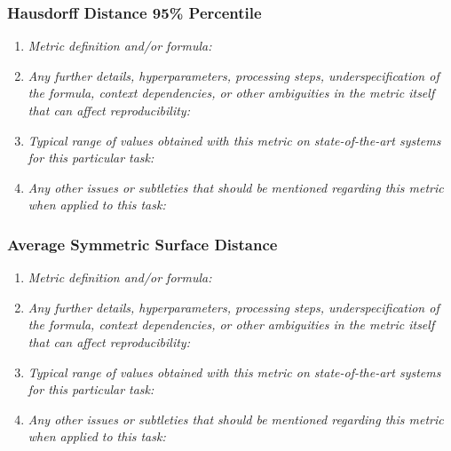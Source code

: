 \documentclass[a4paper,11pt]{article}
\begin{document}
        \subsubsection{Hausdorff Distance 95\% Percentile}
            \begin{enumerate}[label=\alph*.]
                \item \textit{Metric definition and/or formula:}
                \bigskip
                \item \textit{Any further details, hyperparameters, processing steps, underspecification of the formula, context dependencies, or other ambiguities in the metric itself that can affect reproducibility:}
                \bigskip
                \item \textit{Typical range of values obtained with this metric on state-of-the-art systems for this particular task:}
                \bigskip
                \item \textit{Any other issues or subtleties that should be mentioned regarding this metric when applied to this task:}
                \bigskip
            \end{enumerate}
        \subsubsection{Average Symmetric Surface Distance}
            \begin{enumerate}[label=\alph*.]
                \item \textit{Metric definition and/or formula:}
                \bigskip
                \item \textit{Any further details, hyperparameters, processing steps, underspecification of the formula, context dependencies, or other ambiguities in the metric itself that can affect reproducibility:}
                \bigskip
                \item \textit{Typical range of values obtained with this metric on state-of-the-art systems for this particular task:}
                \bigskip
                \item \textit{Any other issues or subtleties that should be mentioned regarding this metric when applied to this task:}
                \bigskip
            \end{enumerate}
\end{document}
